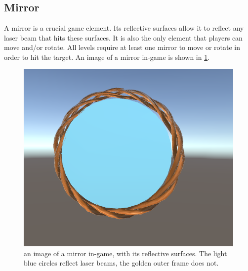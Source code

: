 		\subsection{Mirror} \label{ssec:mirror}
			A mirror is a crucial game element. Its reflective surfaces
			allow it to reflect any laser beam that hits these surfaces.
			It is also the only element that players can move and/or rotate.
			All levels require at least one mirror to move or rotate
			in order to hit the target. An image of a mirror in-game is shown
			in \ref{fig:mirror}.
			\begin{figure}[h!]
				\centering
				\includegraphics[scale = 0.3]{Mirror}
				\caption{an image of a mirror in-game, with its reflective surfaces.
				The light blue circles reflect laser beams, the golden outer frame
				does not.}
				\label{fig:mirror}
			\end{figure}
			
